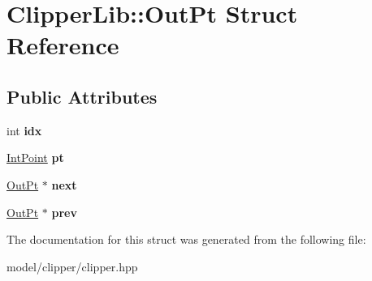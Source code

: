 \hypertarget{structClipperLib_1_1OutPt}{\section{Clipper\-Lib\-:\-:Out\-Pt Struct Reference}
\label{structClipperLib_1_1OutPt}
}
\subsection*{Public Attributes}
\begin{DoxyCompactItemize}
\item 
\hypertarget{structClipperLib_1_1OutPt_a26b2c6bbb58aeb1fb8f735f8c9724828}{int {\bfseries idx}}\label{structClipperLib_1_1OutPt_a26b2c6bbb58aeb1fb8f735f8c9724828}

\item 
\hypertarget{structClipperLib_1_1OutPt_a5caa323c71f499f356787736bdf56570}{\hyperlink{structClipperLib_1_1IntPoint}{Int\-Point} {\bfseries pt}}\label{structClipperLib_1_1OutPt_a5caa323c71f499f356787736bdf56570}

\item 
\hypertarget{structClipperLib_1_1OutPt_ac3c6f3399717ca134aaa21e6c3915cf7}{\hyperlink{structClipperLib_1_1OutPt}{Out\-Pt} $\ast$ {\bfseries next}}\label{structClipperLib_1_1OutPt_ac3c6f3399717ca134aaa21e6c3915cf7}

\item 
\hypertarget{structClipperLib_1_1OutPt_a381945867f8900451ab3c9542e9fdbab}{\hyperlink{structClipperLib_1_1OutPt}{Out\-Pt} $\ast$ {\bfseries prev}}\label{structClipperLib_1_1OutPt_a381945867f8900451ab3c9542e9fdbab}

\end{DoxyCompactItemize}


The documentation for this struct was generated from the following file\-:\begin{DoxyCompactItemize}
\item 
model/clipper/clipper.\-hpp\end{DoxyCompactItemize}

